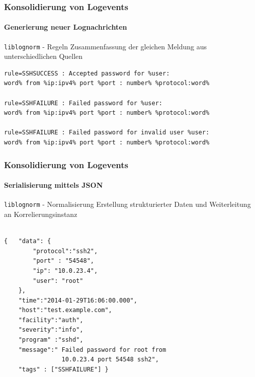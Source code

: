 \begin{frame}[fragile]
\frametitle{Konsolidierung von Logevents}
\framesubtitle{Generierung neuer Lognachrichten }

\begin{block}{\texttt{liblognorm} - Regeln}
\centering Zusammenfassung der gleichen Meldung aus unterschiedlichen Quellen
\end{block}


{\footnotesize
\begin{verbatim}
rule=SSHSUCCESS : Accepted password for %user:
word% from %ip:ipv4% port %port : number% %protocol:word%

rule=SSHFAILURE : Failed password for %user:
word% from %ip:ipv4% port %port : number% %protocol:word%

rule=SSHFAILURE : Failed password for invalid user %user:
word% from %ip:ipv4% port %port : number% %protocol:word%
\end{verbatim}
}
\end{frame}

\begin{frame}[fragile]
\frametitle{Konsolidierung von Logevents}
\framesubtitle{Serialisierung mittels JSON}

\begin{block}{\texttt{liblognorm} - Normalisierung}
\centering Erstellung strukturierter Daten und Weiterleitung an Korrelierungsinstanz
\end{block}

\begin{center}
    \begin{minipage}{0.7\textwidth}
        \begin{verbatim}
        
{   "data": {
        "protocol":"ssh2",
        "port" : "54548",
        "ip": "10.0.23.4",
        "user": "root"
    },
    "time":"2014-01-29T16:06:00.000",
    "host":"test.example.com",
    "facility":"auth",
    "severity":"info",
    "program" :"sshd",
    "message":" Failed password for root from
                10.0.23.4 port 54548 ssh2",
    "tags" : ["SSHFAILURE"] }
        \end{verbatim}
    \end{minipage}
\end{center}
\end{frame}

